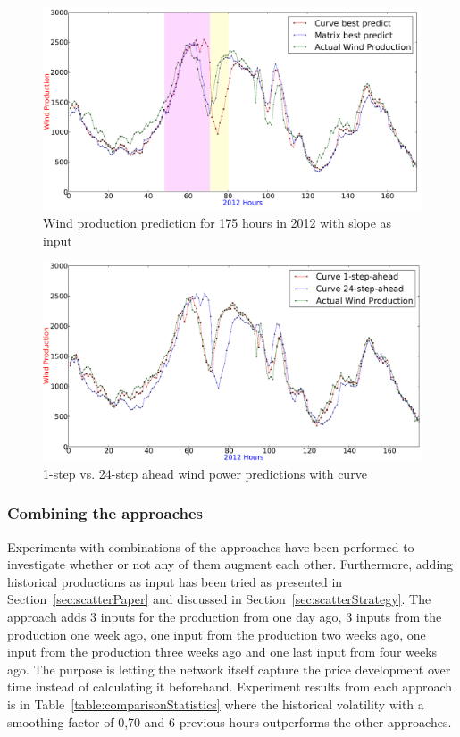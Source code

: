 \begin{figure}[H]
\centering
\includegraphics[width=0.99\linewidth]{billeder/curveAnalysisWindProduction.png}
\caption{Wind production prediction for 175 hours in 2012 with slope as input}
\label{fig:basicCurveAnalysisGrapho}
\end{figure} 

\begin{figure}[H]
\centering
\includegraphics[width=0.99\linewidth]{billeder/curveOneAheadvs24Ahead.png}
\caption{1-step vs. 24-step ahead wind power predictions with curve}
\label{fig:curveOneAheadvs24Ahead}
\end{figure}   

\subsubsection{Combining the approaches}
\label{sec:combiningTheApproachesWP}
Experiments with combinations of the approaches have been performed to investigate whether or not any of them augment each other. Furthermore, adding historical productions as input has been tried as presented in Section~\ref{sec:scatterPaper} and discussed in Section~\ref{sec:scatterStrategy}. The approach adds 3 inputs for the production from one day ago, 3 inputs from the production one week ago, one input from the production two weeks ago, one input from the production three weeks ago and one last input from four weeks ago. The purpose is letting the network itself capture the price development over time instead of calculating it beforehand. Experiment results from each approach is in Table~\ref{table:comparisonStatistics} where the historical volatility with a smoothing factor of 0,70 and 6 previous hours outperforms the other approaches. 

